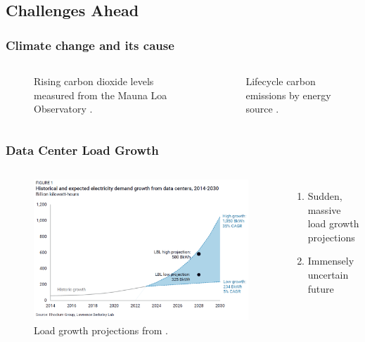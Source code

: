 \subsection{Challenges Ahead}
\begin{frame}
    \frametitle{Climate change and its cause}
    \begin{columns}
        \column[t]{5.2cm}
            \begin{figure}[htbp!]
                \begin{center}
                \resizebox{\columnwidth}{!}{}
                \end{center}
                    \caption{Rising carbon dioxide levels measured from the Mauna Loa Observatory \cite{kane_atmospheric_1996}.}
                \label{fig:co2-rising}
            \end{figure}
        \column[t]{5.2cm}
            \begin{figure}
                \centering
                \resizebox{\columnwidth}{!}{}
                \caption{Lifecycle carbon emissions by energy source
                \cite{united_nations_economic_commission_for_europe_carbon_2022}.}
                \label{fig:energy-emissions}
            \end{figure}
    \end{columns}
    
\end{frame}

\begin{frame}
    \frametitle{Data Center Load Growth}
    \begin{columns}
        \column[t]{7cm}
        \begin{figure}
            \centering
            \includegraphics[width=\columnwidth]{figures/datacenter-load-growth.png}
            \caption{Load growth projections from \cite{king_potential_2025}.}
        \end{figure}
        \column[t]{3.4cm}
        \begin{enumerate}
            \item Sudden, massive load growth projections
            \item Immensely uncertain future
        \end{enumerate}
    \end{columns}
\end{frame}

